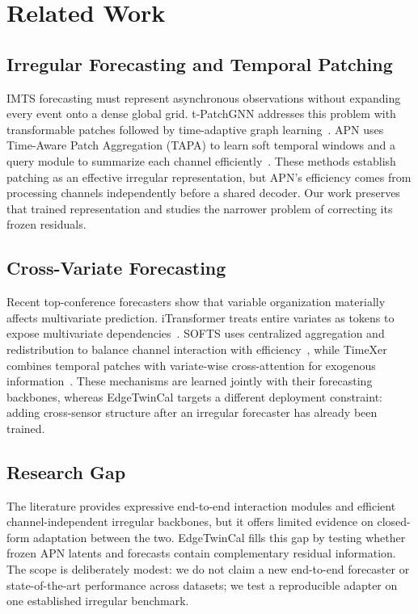 \documentclass[conference]{IEEEtran}
\begin{document}
\section{Related Work}
\subsection{Irregular Forecasting and Temporal Patching}
IMTS forecasting must represent asynchronous observations without expanding every event onto a dense global grid. t-PatchGNN addresses this problem with transformable patches followed by time-adaptive graph learning~\cite{zhang2024tpatchgnn}. APN uses Time-Aware Patch Aggregation (TAPA) to learn soft temporal windows and a query module to summarize each channel efficiently~\cite{liu2026apn}. These methods establish patching as an effective irregular representation, but APN's efficiency comes from processing channels independently before a shared decoder. Our work preserves that trained representation and studies the narrower problem of correcting its frozen residuals.

\subsection{Cross-Variate Forecasting}
Recent top-conference forecasters show that variable organization materially affects multivariate prediction. iTransformer treats entire variates as tokens to expose multivariate dependencies~\cite{liu2024itransformer}. SOFTS uses centralized aggregation and redistribution to balance channel interaction with efficiency~\cite{han2024softs}, while TimeXer combines temporal patches with variate-wise cross-attention for exogenous information~\cite{wang2024timexer}. These mechanisms are learned jointly with their forecasting backbones, whereas EdgeTwinCal targets a different deployment constraint: adding cross-sensor structure after an irregular forecaster has already been trained.

\subsection{Research Gap}
The literature provides expressive end-to-end interaction modules and efficient channel-independent irregular backbones, but it offers limited evidence on closed-form adaptation between the two. EdgeTwinCal fills this gap by testing whether frozen APN latents and forecasts contain complementary residual information. The scope is deliberately modest: we do not claim a new end-to-end forecaster or state-of-the-art performance across datasets; we test a reproducible adapter on one established irregular benchmark.
\end{document}
